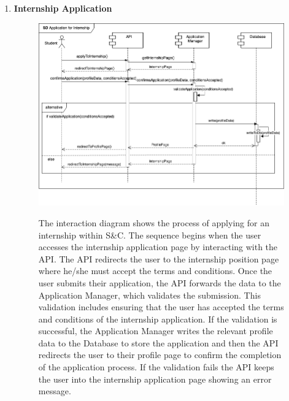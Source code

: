 \begin{enumerate}
    \newpage
    \item \textbf{Internship Application}
    \begin{figure}[h!]
            \centering  \includegraphics[width=1\textwidth]{DD/Images/Interactions/INT06_InternshipApplication.drawio.png}
            \label{fig:ComponentViewDiagram}
            \caption*{
            The interaction diagram shows the process of applying for an internship within S\&C. The sequence begins when the user accesses the internship application page by interacting with the API. The API redirects the user to the internship position page where he/she must accept the terms and conditions. Once the user submits their application, the API forwards the data to the Application Manager, which validates the submission. This validation includes ensuring that the user has accepted the terms and conditions of the internship application. If the validation is successful, the Application Manager writes the relevant profile data to the Database to store the application and then the API redirects the user to their profile page to confirm the completion of the application process.
            If the validation fails the API keeps the user into the internship application page showing an error message.
            }
    \end{figure}


\end{enumerate}
